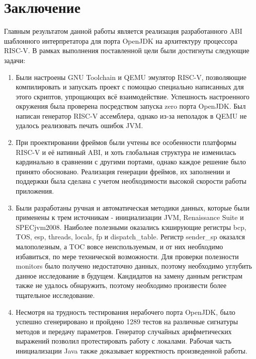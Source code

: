\section*{Заключение}

Главным результатом данной работы является реализация разработанного ABI шаблонного интерпретатора для порта OpenJDK на архитектуру процессора RISC-V. В рамках выполнения поставленной цели были достигнуты следующие задачи:

\begin{enumerate}
    \item Были настроены GNU Toolchain и QEMU эмулятор RISC-V, позволяющие компилировать и запускать проект с помощью специально написанных для этого скриптов, упрощающих всё взаимодействие. Успешность настроенного окружения была проверена посредством запуска zero порта OpenJDK. Был написан генератор RISC-V ассемблера, однако из-за неполадок в QEMU не удалось реализовать печать ошибок JVM.
    
    \item При проектировании фреймов были учтены все особенности платформы RISC-V и её нативный ABI, и хоть глобальная структура не изменилась кардинально в сравнении с другими портами, однако каждое решение было принято обосновано. Реализация генерации фреймов, их заполнении и поддержки была сделана с учетом необходимости высокой скорости работы приложения.
    
    \item Были разработаны ручная и автоматическая методики данных, которые были применены к трем источникам - инициализации JVM, Renaissance Suite и SPECjvm2008. Наиболее полезными оказались кэширующие регистры bcp, TOS, esp, threads, locals, fp и dispatch\_table. Регистр sender\_sp оказался малополезным, а TOC вовсе неиспользуемым, и от них необходимо избавиться, по мере технической возможности. Для проверки полезности monitors было получено недостаточно данных, поэтому необходимо углубить данное исследование в будущем. Кандидатов на замену данным регистрам также не удалось обнаружить, поэтому необходимо произвести более тщательное исследование.
    
    \item Несмотря на трудность тестирования нерабочего порта OpenJDK, было успешно сгенерировано и пройдено 1289 тестов на различные сигнатуры методов и передачу параметров. Генератор случайных арифметических выражений позволил протестировать работу с локалами. Рабочая часть инициализации Java также доказывает корректность произведенной работы.
\end{enumerate}

